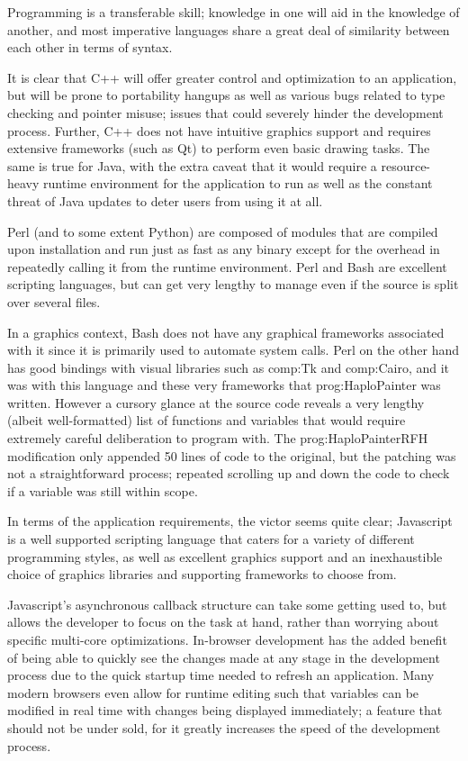 Programming is a transferable skill; knowledge in one will aid in the knowledge of another, and most imperative languages share a great deal of similarity between each other in terms of syntax. 

It is clear that C++ will offer greater control and optimization to an application, but will be prone to portability hangups as well as various bugs related to type checking and pointer misuse; issues that could severely hinder the development process. Further, C++ does not have intuitive graphics support and requires extensive frameworks (such as Qt) to perform even basic drawing tasks. The same is true for Java, with the extra caveat that it would require a resource-heavy runtime environment for the application to run as well as the constant threat of Java updates to deter users from using it at all.

Perl (and to some extent Python) are composed of modules that are compiled upon installation and run just as fast as any binary except for the overhead in repeatedly calling it from the runtime environment. Perl and Bash are excellent scripting languages, but can get very lengthy to manage even if the source is split over several files. 

In a graphics context, Bash does not have any graphical frameworks associated with it since it is primarily used to automate system calls. Perl on the other hand has good bindings with visual libraries such as \gls{comp:Tk} and \gls{comp:Cairo}, and it was with this language and these very frameworks that \gls{prog:HaploPainter} was written. However a cursory glance at the source code reveals a very lengthy (albeit well-formatted) list of functions and variables that would require extremely careful deliberation to program with. The \gls{prog:HaploPainterRFH} modification only appended 50 lines of code to the original, but the patching was not a straightforward process; repeated scrolling up and down the code to check if a variable was still within scope.

In terms of the application requirements, the victor seems quite clear; Javascript is a well supported scripting language that caters for a variety of different programming styles, as well as excellent graphics support and an inexhaustible choice of graphics libraries and supporting frameworks to choose from.

Javascript's asynchronous callback structure can take some getting used to, but allows the developer to focus on the task at hand, rather than worrying about specific multi-core optimizations. In-browser development has the added benefit of being able to quickly see the changes made at any stage in the development process due to the quick startup time needed to refresh an application. Many modern browsers even allow for runtime editing such that variables can be modified in real time with changes being displayed immediately; a feature that should not be under sold, for it greatly increases the speed of the development process.

